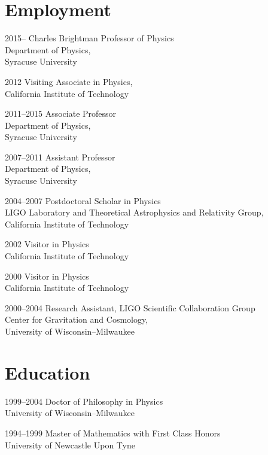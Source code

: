 \documentclass{cv}
\begin{document}
\vspace*{-0.5cm}
\section{Employment}
\begin{entry}
  \item[2015--]Charles Brightman Professor of Physics\\
               Department of Physics,\\
               Syracuse University
  \item[{2012}]
    Visiting Associate in Physics,\\
    California Institute of Technology
  \item[2011--2015]Associate Professor\\
               Department of Physics,\\
               Syracuse University
  \item[2007--2011]Assistant Professor\\
               Department of Physics,\\
               Syracuse University
  \item[2004--2007]Postdoctoral Scholar in Physics\\
               LIGO Laboratory and Theoretical Astrophysics and Relativity
               Group, \\
               California Institute of Technology
  \item[{2002}]
    Visitor in Physics\\
    California Institute of Technology
  \item[{2000}]
    Visitor in Physics\\
    California Institute of Technology
  \item[{2000}--{2004}]
    Research Assistant, LIGO Scientific Collaboration Group\\
    Center for Gravitation and Cosmology, \\
    University of Wisconsin--Milwaukee
\end{entry}

\vspace*{-0.5cm}
\section{Education}
\begin{entry}
  \item[1999--2004]Doctor of Philosophy in Physics\\
               University of Wisconsin--Milwaukee \\
  \item[1994--1999] Master of Mathematics with First Class Honors\\
   University of Newcastle Upon Tyne \\
\end{entry}
\end{document}
